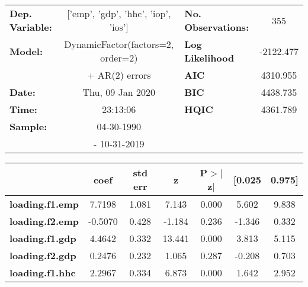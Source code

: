 \begin{center}
\begin{tabular}{lclc}
\toprule
\textbf{Dep. Variable:}          & ['emp', 'gdp', 'hhc', 'iop', 'ios'] & \textbf{  No. Observations:  } &                 355                  \\
\textbf{Model:}                  &  DynamicFactor(factors=2, order=2)  & \textbf{  Log Likelihood     } &              -2122.477               \\
\textbf{}                        &            + AR(2) errors           & \textbf{  AIC                } &               4310.955               \\
\textbf{Date:}                   &           Thu, 09 Jan 2020          & \textbf{  BIC                } &               4438.735               \\
\textbf{Time:}                   &               23:13:06              & \textbf{  HQIC               } &               4361.789               \\
\textbf{Sample:}                 &              04-30-1990             & \textbf{                     } &                                      \\
\textbf{}                        &             - 10-31-2019            & \textbf{                     } &                                      \\
\bottomrule
\end{tabular}
\begin{tabular}{lcccccc}
                          & \textbf{coef} & \textbf{std err} & \textbf{z} & \textbf{P$>$$|$z$|$} & \textbf{[0.025} & \textbf{0.975]}  \\
\midrule
\textbf{loading.f1.emp}   &       7.7198  &        1.081     &     7.143  &         0.000        &        5.602    &        9.838     \\
\textbf{loading.f2.emp}   &      -0.5070  &        0.428     &    -1.184  &         0.236        &       -1.346    &        0.332     \\
\textbf{loading.f1.gdp}   &       4.4642  &        0.332     &    13.441  &         0.000        &        3.813    &        5.115     \\
\textbf{loading.f2.gdp}   &       0.2476  &        0.232     &     1.065  &         0.287        &       -0.208    &        0.703     \\
\textbf{loading.f1.hhc}   &       2.2967  &        0.334     &     6.873  &         0.000        &        1.642    &        2.952     \\

\end{tabular}
\end{center}
